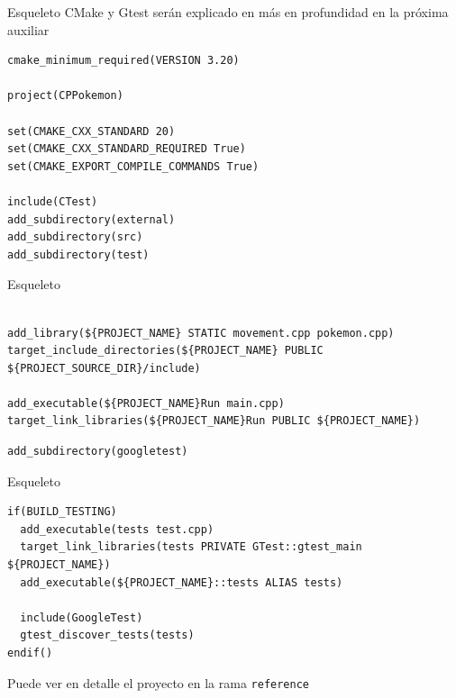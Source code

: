 \documentclass{beamer}
\begin{document}
%
\begin{frame}[fragile]{Esqueleto}
CMake y Gtest serán explicado en más en profundidad en la próxima auxiliar

\begin{verbatim}
cmake_minimum_required(VERSION 3.20)

project(CPPokemon)

set(CMAKE_CXX_STANDARD 20)
set(CMAKE_CXX_STANDARD_REQUIRED True)
set(CMAKE_EXPORT_COMPILE_COMMANDS True)

include(CTest)
add_subdirectory(external)
add_subdirectory(src)
add_subdirectory(test)

\end{verbatim}
\end{frame}

\begin{frame}[fragile]{Esqueleto}
\begin{verbatim}

add_library(${PROJECT_NAME} STATIC movement.cpp pokemon.cpp)
target_include_directories(${PROJECT_NAME} PUBLIC ${PROJECT_SOURCE_DIR}/include)

add_executable(${PROJECT_NAME}Run main.cpp)
target_link_libraries(${PROJECT_NAME}Run PUBLIC ${PROJECT_NAME})

\end{verbatim}

\begin{verbatim}
add_subdirectory(googletest)
\end{verbatim}
\end{frame}

\begin{frame}[fragile]{Esqueleto}
\begin{verbatim}
if(BUILD_TESTING)
  add_executable(tests test.cpp)
  target_link_libraries(tests PRIVATE GTest::gtest_main ${PROJECT_NAME})
  add_executable(${PROJECT_NAME}::tests ALIAS tests)

  include(GoogleTest)
  gtest_discover_tests(tests)
endif()
\end{verbatim}
Puede ver en detalle el proyecto en la rama \texttt{reference}
\end{frame}
\end{document}
